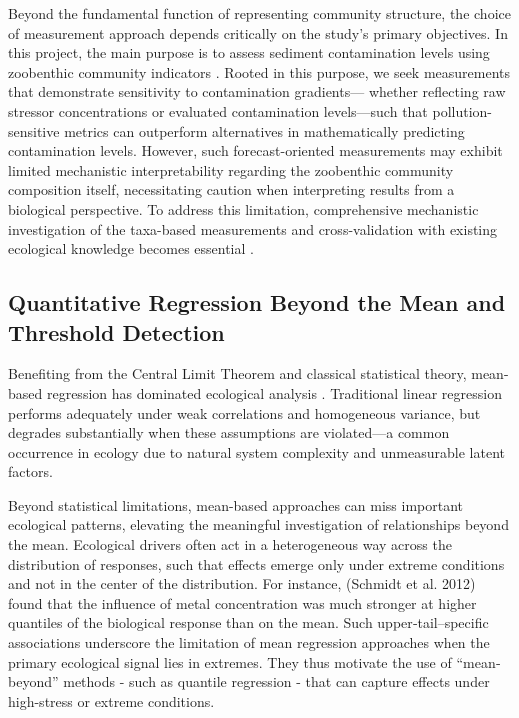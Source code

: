 Beyond the fundamental function of representing community structure, the choice of measurement approach 
depends critically on the study's primary objectives. In this project, the main purpose is to 
assess sediment contamination levels using zoobenthic community indicators \cite{Ciborowski2005ZoobenthicIndicators}.
Rooted in this purpose, we seek measurements that demonstrate sensitivity to contamination gradients—
whether reflecting raw stressor concentrations or evaluated contamination levels—such that 
pollution-sensitive metrics can outperform alternatives in mathematically predicting contamination levels.
However, such forecast-oriented measurements may exhibit limited mechanistic interpretability 
regarding the zoobenthic community composition itself, necessitating caution when 
interpreting results from a biological perspective.
To address this limitation, comprehensive mechanistic investigation of the taxa-based measurements 
and cross-validation with existing ecological knowledge becomes essential \cite{Reynoldson1999RCA}.


\subsection{Quantitative Regression Beyond the Mean and Threshold Detection}
Benefiting from the Central Limit Theorem and classical statistical theory,
mean-based regression has dominated ecological analysis \cite{Cade2003}.
Traditional linear regression performs adequately under weak correlations 
and homogeneous variance, but degrades substantially when these assumptions 
are violated—a common occurrence in ecology due to natural system complexity 
and unmeasurable latent factors. 

Beyond statistical limitations, mean-based approaches can miss important ecological
patterns, elevating the meaningful investigation of relationships beyond the mean.
Ecological drivers often act in a heterogeneous way across the distribution of
responses, such that effects emerge only under extreme conditions and not in the 
center of the distribution. 
For instance, \cite{Schmidt2012Quantile}(Schmidt et al. 2012)
found that the influence of metal concentration was much stronger 
at higher quantiles of the biological response than on the mean.
Such upper‐tail–specific associations underscore the limitation of 
mean regression approaches when the primary ecological signal lies in extremes.
They thus motivate the use of “mean‐beyond” methods
- such as quantile regression - that can capture 
effects under high-stress or extreme conditions.

